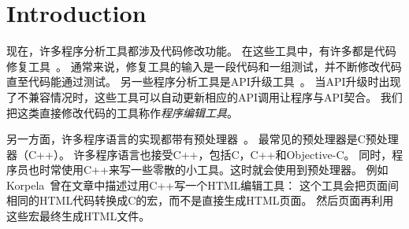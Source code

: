 

\section{Introduction}
\label{sec:intro}


现在，许多程序分析工具都涉及代码修改功能。
在这些工具中，有许多都是代码修复工具~\parencite{le2012genprog,le2012systematic,QiMLDW14,nguyen2013semfix}。
通常来说，修复工具的输入是一段代码和一组测试，并不断修改代码直至代码能通过测试。
另一些程序分析工具是API升级工具~\parencite{li2015swin,Padioleau06,Meng:2011}。
当API升级时出现了不兼容情况时，这些工具可以自动更新相应的API调用让程序与API契合。
我们把这类直接修改代码的工具称作\emph{程序编辑工具}。

另一方面，许多程序语言的实现都带有预处理器~\parencite{ernst2002empirical,kohlbecker1986hygienic,lee2012marco}。
最常见的预处理器是C预处理器（C++）。
许多程序语言也接受C++，包括C，C++和Objective-C。
同时，程序员也时常使用C++来写一些零散的小工具。这时就会使用到预处理器。
例如Korpela~\parencite{Korpela2000}曾在文章中描述过用C++写一个HTML编辑工具：
这个工具会把页面间相同的HTML代码转换成C的宏，而不是直接生成HTML页面。
然后页面再利用这些宏最终生成HTML文件。

